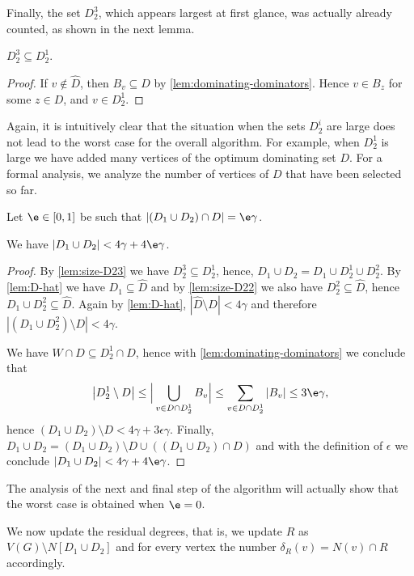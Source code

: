 Finally, the set $D_2^3$, which appears largest at first glance, was
actually already counted, as shown in the next lemma.
\begin{lemma}\label{lem:size-D23}
  $D_2^3\subseteq D_2^1$.
\end{lemma}
\begin{proof}
  If $v\not\in \hat{D}$, then $B_v\subseteq D$ by
  \cref{lem:dominating-dominators}.  Hence $v\in B_z$ for some
  $z\in D$, and $v\in D_2^1$.
\end{proof}

Again, it is intuitively clear that the situation when the sets
$D_2^i$ are large does not lead to the worst case for the overall
algorithm. For example, when $D_2^1$ is large we have added many
vertices of the optimum dominating set $D$. For a formal analysis, we
analyze the number of vertices of $D$ that have been selected so far.

\begin{tcolorbox}
  Let $\e\in [0,1]$ be such that $|(D_1 \cup D_2)\cap D| =\e\gamma$.
\end{tcolorbox}

%


\smallskip
\begin{lemma}\label{lem:size-D12}
  We have $|D_1\cup D_2| < 4\gamma+4\e\gamma$.
\end{lemma}
\begin{proof}
  By \cref{lem:size-D23} we have $D_2^3\subseteq D_2^1$, hence,
  $D_1\cup D_2=D_1\cup D_2^1\cup D_2^2$. By \cref{lem:D-hat} we have
  $D_1 \subseteq \hat D$ and by \cref{lem:size-D22} we also have
  $D_2^2 \subseteq \hat D$, hence $D_1\cup D_2^2\subseteq \hat D$.
  Again by \cref{lem:D-hat}, $|\hat D \setminus D|<4\gamma$ and
  therefore $|(D_1 \cup D_2^2 )\setminus D| < 4 \gamma$.

  We have $W\cap D\subseteq D_2^1\cap D$, hence with
  \cref{lem:dominating-dominators} we conclude that
  \[
    \big\vert D_2^1 \setminus D \big\vert \leq
    \Big\vert\bigcup\limits_{v\in D \cap D_2^1}B_v\Big\vert \leq
    \sum\limits_{v\in D \cap D_2^1} |B_v| \leq 3\e\gamma,
  \]
  hence $(D_1\cup D_2)\setminus D<4\gamma+3\epsilon\gamma$. Finally,
  $D_1\cup D_2=(D_1\cup D_2)\setminus D\cup ((D_1\cup D_2)\cap D)$ and
  with the definition of $\epsilon$ we conclude
  $|D_1\cup D_2|<4\gamma + 4\e\gamma$.
\end{proof}

The analysis of the next and final step of the algorithm will actually
show that the worst case is obtained when $\e=0$.

We now update the residual degrees, that is, we update $R$ as
$V(G)\setminus N[D_1\cup D_2]$ and for every vertex the number
$\delta_R(v)=N(v)\cap R$ accordingly.
